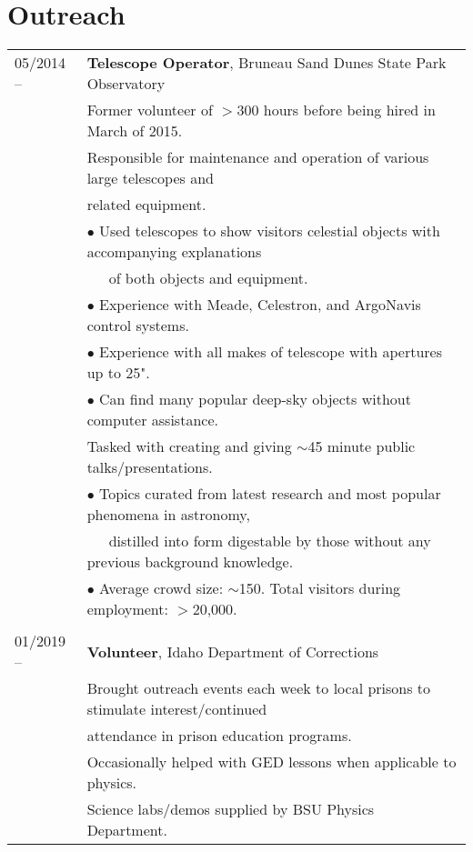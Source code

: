 \documentclass[11pt]{article}
\begin{document}
\section {Outreach}
\begin{tabular}{ll}
05/2014 --    &   \textbf{Telescope Operator}, Bruneau Sand Dunes State Park Observatory \\
      & Former volunteer of $>$300 hours before being hired in March of 2015.\vspace{2mm} \\
      & Responsible for maintenance and operation of various large telescopes and \\
      & related equipment.\\
      & $\bullet$ Used telescopes to show visitors celestial objects with accompanying explanations \\
      & \-\ \-\ \-\ of both objects and equipment.\\
      & $\bullet$ Experience with Meade, Celestron, and ArgoNavis control systems.\\
      & $\bullet$ Experience with all makes of telescope with apertures up to 25".\\
      & $\bullet$ Can find many popular deep-sky objects without computer assistance.\vspace{1mm} \\
      & Tasked with creating and giving $\sim$45 minute public talks/presentations.\\
      & $\bullet$ Topics curated from latest research and most popular phenomena in astronomy, \\
      & \-\ \-\ \-\ distilled into form digestable by those without any previous background knowledge.\\
      & $\bullet$ Average crowd size: $\sim$150. Total visitors during employment: $>$20,000.\\
      & \\
01/2019 --    &   \textbf{Volunteer}, Idaho Department of Corrections \vspace{1mm} \\
      & Brought outreach events each week to local prisons to stimulate interest/continued \\
      & attendance in prison education programs.\\
      & Occasionally helped with GED lessons when applicable to physics.\\
      & Science labs/demos supplied by BSU Physics Department.\vspace{1mm}\\

\end{tabular}
\end{document}

